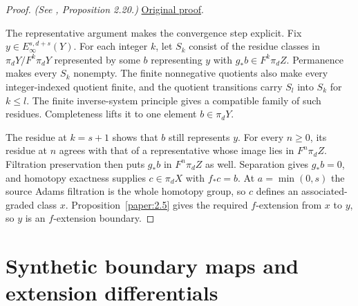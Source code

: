 \begin{proof}
\textit{(See \cite{LWX126}, Proposition 2.20.)} \href{paper/main.tex.html#L656}{Original proof}.

The representative argument makes the convergence step explicit. Fix
$y\in E_\infty^{s,d+s}(Y)$. For each integer $k$, let $S_k$ consist of the
residue classes in $\pi_dY/F^k\pi_dY$ represented by some $b$ representing
$y$ with $g_*b\in F^k\pi_dZ$. Permanence makes every $S_k$ nonempty.
The finite nonnegative quotients also make every integer-indexed quotient
finite, and the quotient transitions carry $S_l$ into $S_k$ for $k\leq l$.
The finite inverse-system principle gives a compatible family of such
residues. Completeness lifts it to one element $b\in\pi_dY$.

The residue at $k=s+1$ shows that $b$ still represents $y$. For every
$n\geq0$, its residue at $n$ agrees with that of a representative whose
image lies in $F^n\pi_dZ$. Filtration preservation then puts $g_*b$ in
$F^n\pi_dZ$ as well. Separation gives $g_*b=0$, and homotopy exactness
supplies $c\in\pi_dX$ with $f_*c=b$. At $a=\min(0,s)$ the source Adams
filtration is the whole homotopy group, so $c$ defines an
associated-graded class $x$. Proposition~\ref{paper:2.5} gives the required
$f$-extension from $x$ to $y$, so $y$ is an $f$-extension boundary.
\end{proof}

\section{Synthetic boundary maps and extension differentials}

